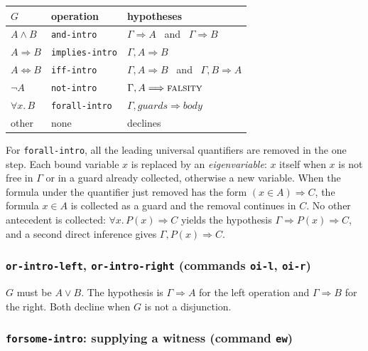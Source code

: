 \begin{center}
\begin{tabular}{@{}lll@{}}
\toprule
$G$ & operation & hypotheses \\
\midrule
$A \wedge B$ & \texttt{and-intro} & $\Gamma \Longrightarrow A$ \ and \ $\Gamma \Longrightarrow B$ \\
$A \Rightarrow B$ & \texttt{implies-intro} & $\Gamma, A \Longrightarrow B$ \\
$A \Leftrightarrow B$ & \texttt{iff-intro} & $\Gamma, A \Longrightarrow B$ \ and \ $\Gamma, B \Longrightarrow A$ \\
$\neg A$ & \texttt{not-intro} & $\Gamma, A \Longrightarrow \textsc{falsity}$ \\
$\forall x.\, B$ & \texttt{forall-intro} & $\Gamma, \textit{guards} \Longrightarrow \textit{body}$ \\
other & none & declines \\
\bottomrule
\end{tabular}
\end{center}

For \texttt{forall-intro}, all the leading universal quantifiers are
removed in the one step.  Each bound variable $x$ is replaced by an
\emph{eigenvariable}: $x$ itself when $x$ is not free in $\Gamma$ or in a
guard already collected, otherwise a new variable.  When the formula
under the quantifier just removed has the form $(x \in A) \Rightarrow C$,
the formula $x \in A$ is collected as a guard and the removal continues
in $C$.  No other antecedent is collected:
$\forall x.\, P(x) \Rightarrow C$ yields the hypothesis
$\Gamma \Longrightarrow P(x) \Rightarrow C$, and a second direct inference
gives $\Gamma, P(x) \Longrightarrow C$.

\subsubsection*{\texttt{or-intro-left}, \texttt{or-intro-right}
  (commands \texttt{oi-l}, \texttt{oi-r})}

$G$ must be $A \vee B$.  The hypothesis is $\Gamma \Longrightarrow A$ for
the left operation and $\Gamma \Longrightarrow B$ for the right.  Both
decline when $G$ is not a disjunction.

\subsubsection*{\texttt{forsome-intro}: supplying a witness (command \texttt{ew})}

